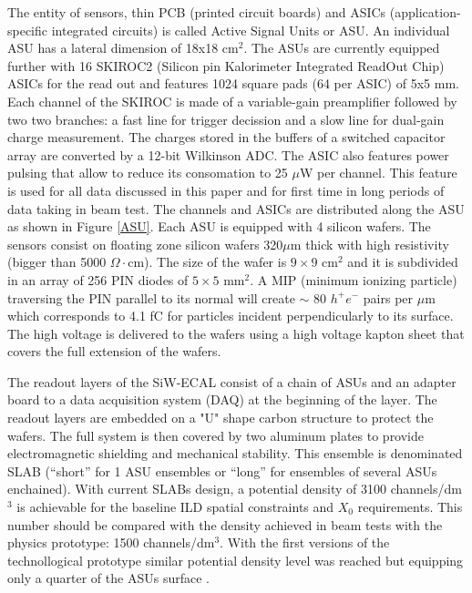 \documentclass[final,3p,times,twocolumn]{elsarticle}
\begin{document}
The entity
of sensors, thin PCB (printed circuit boards) and ASICs (application-specific integrated circuits)
is called Active Signal Units or ASU.
An individual ASU has a lateral dimension of 18x18 cm$^{2}$.
The ASUs are currently equipped
further with 16 SKIROC2\cite{Callier:2011zz,Amjad:2014tha,Suehara:2018mqk}  (Silicon pin Kalorimeter Integrated ReadOut Chip)
ASICs for the read out and features 1024 square pads (64 per ASIC) of 5x5 mm.
Each channel of the SKIROC is made of a variable-gain preamplifier followed by two
two branches: a fast line for trigger decission and a slow line for dual-gain charge measurement.
The charges stored in the buffers of a switched capacitor array are converted by a 12-bit Wilkinson ADC.
The ASIC also features power pulsing that allow to reduce its consomation to
25 $\mu$W per channel. This feature is used for all data discussed in this paper
and for first time in long periods of data taking in beam test.
The channels and ASICs are distributed along the ASU as shown in Figure \ref{ASU}.
Each ASU is equipped with 4 silicon wafers. The sensors consist on floating zone silicon wafers
320$\mu$m thick with high resistivity (bigger than 5000 $\Omega\cdot$cm).
The size of the wafer is $9\times9$ cm$^{2}$ and it is subdivided in an array of 256 PIN diodes of $5\times5$ mm$^{2}$.
A MIP (minimum ionizing particle) traversing the PIN parallel to its normal will create
$\sim$ 80 $h^{+}e^{-}$ pairs per $\mu$m which corresponds to 4.1 fC
for particles incident perpendicularly to its surface.
The high voltage is delivered to the wafers using a high voltage kapton sheet that covers the full extension of the wafers.

The readout layers of the SiW-ECAL consist of a chain of ASUs and an adapter board
to a data acquisition system (DAQ) at the beginning of the layer.
The readout layers are embedded on a "U" shape carbon structure to protect the wafers.
The full system is then covered by two aluminum plates
to provide electromagnetic shielding and mechanical stability.
This ensemble is denominated SLAB
(``short'' for 1 ASU ensembles or ``long'' for ensembles of several ASUs enchained).
With current SLABs design, a potential density of
3100 channels/dm$^{3}$ is achievable for the baseline ILD spatial constraints and $X_{0}$ requirements.
This number should be compared with
the density achieved in beam tests with the physics prototype: 1500 channels/dm$^{3}$. With the first versions
of the technollogical prototype similar potential density level was reached but equipping only a
quarter of the ASUs surface \cite{Amjad:2014tha}.
\end{document}
